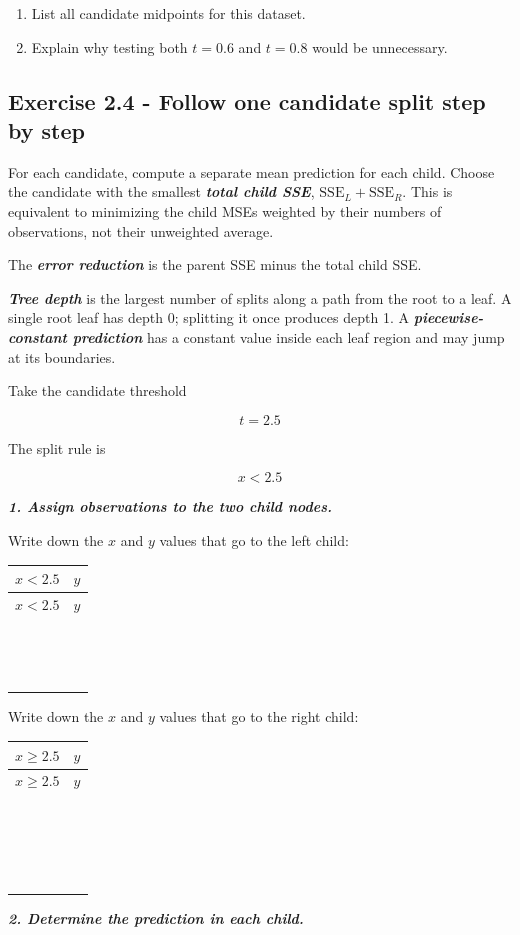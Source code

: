\documentclass{course_sheet}
\begin{document}
\begin{enumerate}
\item
List all candidate midpoints for this dataset.

\item
Explain why testing both $t=0.6$ and $t=0.8$ would be unnecessary.

\end{enumerate}
\subsection*{Exercise 2.4 - Follow one candidate split step by step}
For each candidate, compute a separate mean prediction for each child. Choose the candidate with the smallest \textbf{\textit{total child SSE}}, $\mathrm{SSE}_L+\mathrm{SSE}_R$. This is equivalent to minimizing the child MSEs weighted by their numbers of observations, not their unweighted average.

The \textbf{\textit{error reduction}} is the parent SSE minus the total child SSE.

\textbf{\textit{Tree depth}} is the largest number of splits along a path from the root to a leaf. A single root leaf has depth 0; splitting it once produces depth 1. A \textbf{\textit{piecewise-constant prediction}} has a constant value inside each leaf region and may jump at its boundaries.

Take the candidate threshold

\[
t=2.5
\]

The split rule is

\[
x<2.5
\]

\textbf{\textit{1. Assign observations to the two child nodes.}}

Write down the $x$ and $y$ values that go to the left child:

\begingroup
\small
\setlength{\tabcolsep}{4pt}
\begin{longtable}{l|l}
$x<2.5$ & $y$ \\
\hline
\endfirsthead
$x<2.5$ & $y$ \\
\hline
\endhead
$\phantom{0}$ & $\phantom{0}$ \\[3pt]
$\phantom{0}$ & $\phantom{0}$ \\[3pt]
$\phantom{0}$ & $\phantom{0}$ \\[3pt]
\end{longtable}
\endgroup
Write down the $x$ and $y$ values that go to the right child:

\begingroup
\small
\setlength{\tabcolsep}{4pt}
\begin{longtable}{l|l}
$x\geq 2.5$ & $y$ \\
\hline
\endfirsthead
$x\geq 2.5$ & $y$ \\
\hline
\endhead
$\phantom{0}$ & $\phantom{0}$ \\[3pt]
$\phantom{0}$ & $\phantom{0}$ \\[3pt]
$\phantom{0}$ & $\phantom{0}$ \\[3pt]
$\phantom{0}$ & $\phantom{0}$ \\[3pt]
\end{longtable}
\endgroup
\textbf{\textit{2. Determine the prediction in each child.}}
\end{document}
